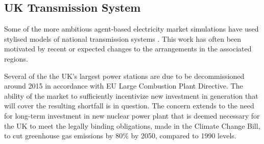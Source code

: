 %
%

\subsection{UK Transmission System}
Some of the more ambitious agent-based electricity market simulations have used
stylised models of national transmission systems
\cite{cincotti:09,weidlich:06}.  This work has often been motivated by recent
or expected changes to the arrangements in the associated regions.


Several of the the UK's largest power stations are due to be decommissioned
around 2015 in accordance with EU Large Combustion Plant Directive.  The
ability of the market to sufficiently incentivize new investment in generation
that will cover the resulting shortfall is in question.  The concern extends
to the need for long-term investment in new nuclear power plant that is deemed
necessary for the UK to meet the legally binding obligations, made in the
Climate Change Bill, to cut greenhouse gas emissions by 80\% by 2050, compared
to 1990 levels.

